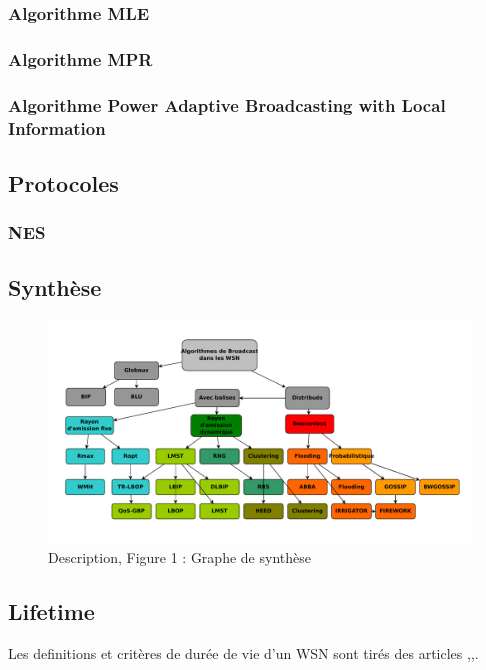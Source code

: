 \subsubsection{Algorithme MLE}
\cite{Cheng06}
\subsubsection{Algorithme MPR}

\subsubsection{Algorithme Power Adaptive Broadcasting with Local Information}
\cite{chen2003}



\subsection{Protocoles}
\subsubsection{NES}

\newpage
\subsection{Synthèse}



\newpage

\begin{figure}[H]
\centering
\includegraphics[scale=1,angle=90]{Etat_de_l'art/source/classification}
\caption{Description, Figure 1 : Graphe de synthèse}
\end{figure} 

\subsection{Lifetime}
Les definitions et critères de durée de vie d'un WSN sont tirés des articles \cite{Dietrich09},\cite{Baert06},\cite{Elleithy11}.



